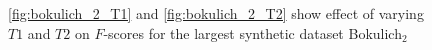 \documentclass[letterpaper,twocolumn]{article}
\begin{document}
\begin{figure}[t]	
	\begin{minipage}[t]{0.5\linewidth}
	\end{minipage}%
	\hfill%
	\begin{minipage}[t]{0.5\linewidth}
	\end{minipage}
	\caption{ \ref{fig:bokulich_2_T1} and \ref{fig:bokulich_2_T2} show effect of varying $T1$ and $T2$ on $F$-scores for the largest synthetic dataset Bokulich$_2$ }	
\end{figure}
\end{document}
